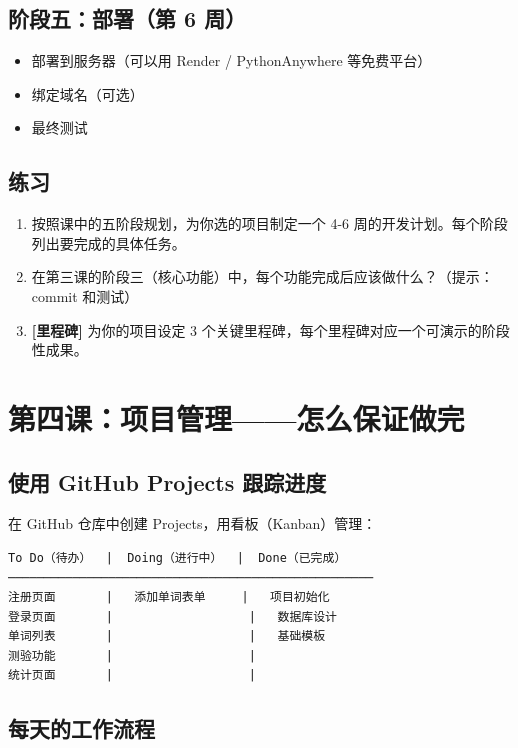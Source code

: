 \documentclass[a4paper,12pt]{ctexart}
\begin{document}
\subsection*{阶段五：部署（第 6 周）}

\begin{itemize}
  \item 部署到服务器（可以用 Render / PythonAnywhere 等免费平台）
  \item 绑定域名（可选）
  \item 最终测试
\end{itemize}

\subsection*{练习}

\begin{enumerate}
  \item 按照课中的五阶段规划，为你选的项目制定一个 4-6 周的开发计划。每个阶段列出要完成的具体任务。
  \item 在第三课的阶段三（核心功能）中，每个功能完成后应该做什么？（提示：commit 和测试）
  \item \textbf{[里程碑]} 为你的项目设定 3 个关键里程碑，每个里程碑对应一个可演示的阶段性成果。
\end{enumerate}

\section*{第四课：项目管理——怎么保证做完}

\subsection*{使用 GitHub Projects 跟踪进度}

在 GitHub 仓库中创建 Projects，用看板（Kanban）管理：

\begin{verbatim}
To Do（待办）  |  Doing（进行中）  |  Done（已完成）
───────────────────────────────────────────────────
注册页面       |   添加单词表单     |   项目初始化
登录页面       |                   |   数据库设计
单词列表       |                   |   基础模板
测验功能       |                   |
统计页面       |                   |
\end{verbatim}

\subsection*{每天的工作流程}
\end{document}
